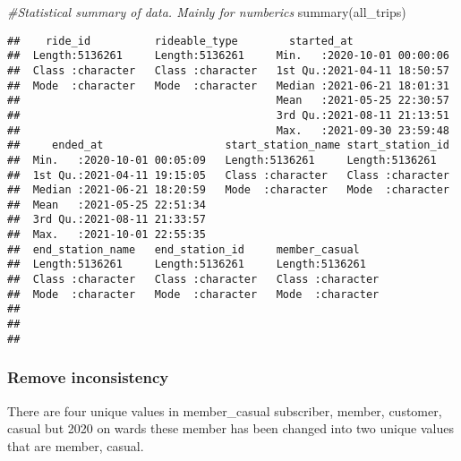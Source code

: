 \documentclass[
]{article}
\newenvironment{Shaded}{\begin{snugshade}}{\end{snugshade}}
\newcommand{\CommentTok}[1]{\textcolor[rgb]{0.56,0.35,0.01}{\textit{#1}}}
\newcommand{\FunctionTok}[1]{\textcolor[rgb]{0.00,0.00,0.00}{#1}}
\newcommand{\NormalTok}[1]{#1}
\newcommand{\SpecialCharTok}[1]{\textcolor[rgb]{0.00,0.00,0.00}{#1}}
\begin{document}
\begin{Shaded}
\begin{Highlighting}[]
\CommentTok{\#Statistical summary of data. Mainly for numberics}
\FunctionTok{summary}\NormalTok{(all\_trips)  }
\end{Highlighting}
\end{Shaded}

\begin{verbatim}
##    ride_id          rideable_type        started_at                 
##  Length:5136261     Length:5136261     Min.   :2020-10-01 00:00:06  
##  Class :character   Class :character   1st Qu.:2021-04-11 18:50:57  
##  Mode  :character   Mode  :character   Median :2021-06-21 18:01:31  
##                                        Mean   :2021-05-25 22:30:57  
##                                        3rd Qu.:2021-08-11 21:13:51  
##                                        Max.   :2021-09-30 23:59:48  
##     ended_at                   start_station_name start_station_id  
##  Min.   :2020-10-01 00:05:09   Length:5136261     Length:5136261    
##  1st Qu.:2021-04-11 19:15:05   Class :character   Class :character  
##  Median :2021-06-21 18:20:59   Mode  :character   Mode  :character  
##  Mean   :2021-05-25 22:51:34                                        
##  3rd Qu.:2021-08-11 21:33:57                                        
##  Max.   :2021-10-01 22:55:35                                        
##  end_station_name   end_station_id     member_casual     
##  Length:5136261     Length:5136261     Length:5136261    
##  Class :character   Class :character   Class :character  
##  Mode  :character   Mode  :character   Mode  :character  
##                                                          
##                                                          
## 
\end{verbatim}

\hypertarget{remove-inconsistency}{%
\subsubsection{Remove inconsistency}\label{remove-inconsistency}}

There are four unique values in member\_casual subscriber, member,
customer, casual but 2020 on wards these member has been changed into
two unique values that are member, casual.

\begin{Shaded}
\end{Shaded}
\end{document}

